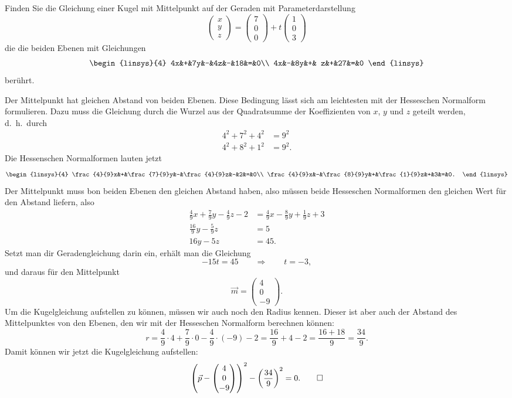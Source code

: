 Finden Sie die Gleichung einer Kugel mit Mittelpunkt auf der Geraden
mit Parameterdarstellung
\[
\begin{pmatrix}x\\y\\z\end{pmatrix}
=
\begin{pmatrix} 7\\0\\0 \end{pmatrix}
+t
\begin{pmatrix}1\\0\\3\end{pmatrix}
\]
die die beiden Ebenen mit Gleichungen
\[
\begin{linsys}{4}
4x&+&7y&-&4z&-&18&=&0\\
4x&-&8y&+& z&+&27&=&0
\end{linsys}
\]
berührt.

\begin{loesung}
Der Mittelpunkt hat gleichen Abstand von beiden Ebenen. 
Diese Bedingung lässt sich am leichtesten mit der Hesseschen Normalform
formulieren.
Dazu muss die Gleichung durch die Wurzel aus der Quadratsumme der
Koeffizienten von $x$, $y$ und $z$ geteilt werden, d.~h.~durch
\begin{align*}
4^2+7^2+4^2&=9^2\\
4^2+8^2+1^2&=9^2.
\end{align*}
Die Hessenschen Normalformen lauten jetzt
\[
\begin{linsys}{4}
\frac{4}{9}x&+&\frac{7}{9}y&-&\frac{4}{9}z&-&2&=&0\\
\frac{4}{9}x&-&\frac{8}{9}y&+&\frac{1}{9}z&+&3&=&0.
\end{linsys}
\]
Der Mittelpunkt muss bon beiden Ebenen den gleichen Abstand haben,
also müssen beide Hesseschen Normalformen den gleichen Wert für den Abstand
liefern, also
\begin{align*}
\frac{4}{9}x+\frac{7}{9}y-\frac{4}{9}z-2&=
\frac{4}{9}x-\frac{8}{9}y+\frac{1}{9}z+3
\\
\frac{16}{9}y-\frac{5}{9}z&=5
\\
16y-5z&=45.
\end{align*}
Setzt man dir Geradengleichung darin ein, erhält man die Gleichung
\[
-15t=45
\qquad\Rightarrow\qquad t=-3,
\]
und daraus für den Mittelpunkt
\[
\vec m=\begin{pmatrix}4\\0\\-9\end{pmatrix}.
\]
Um die Kugelgleichung aufstellen zu können, müssen wir auch noch den
Radius kennen.
Dieser ist aber auch der Abstand des Mittelpunktes von den Ebenen,
den wir mit der Hesseschen Normalform berechnen können:
\[
r
=
\frac{4}{9}\cdot 4+\frac{7}{9}\cdot 0-\frac{4}{9}\cdot (-9)-2
=
\frac{16}{9}+4-2
=
\frac{16+18}{9}
=
\frac{34}{9}.
\]
Damit können wir jetzt die Kugelgleichung aufstellen:
\[
\left(
\vec p - \begin{pmatrix}4\\0\\-9\end{pmatrix}
\right)^2-\biggl(\frac{34}{9}\biggr)^2=0.
\qedhere
\]
\end{loesung}
